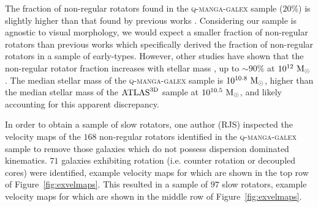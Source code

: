 \documentclass[useAMS,usenatbib]{mn2e}
\begin{document}
The fraction of non-regular rotators found in the \textsc{q-manga-galex} sample ($20\%$) is slightly higher than that found by previous works \citep[$14-17\%$ of early-types in the $\rm{ATLAS}^{\rm{3D}}$ sample; ][]{emsellem11, stott16}. Considering our sample is agnostic to visual morphology, we would expect a smaller fraction of non-regular rotators than previous works which specifically derived the fraction of non-regular rotators in a sample of early-types. However, other studies have shown that the non-regular rotator fraction increases with stellar mass \citep{cappellari13}, up to $\sim90\%$ at $10^{12}~\rm{M}_{\odot}$ \citep{veale17}. The median stellar mass of the \textsc{q-manga-galex} sample is $10^{10.8}~\rm{M}_{\odot}$, higher than the median stellar mass of the $\rm{ATLAS}^{\rm{3D}}$ sample at $10^{10.5}~\rm{M}_{\odot}$, and likely accounting for this apparent discrepancy.

In order to obtain a sample of slow rotators, one author (RJS) inspected the velocity maps of the $168$ non-regular rotators identified in the \textsc{q-manga-galex} sample to remove those galaxies which do not possess dispersion dominated kinematics. $71$ galaxies exhibiting rotation (i.e. counter rotation or decoupled cores) were identified, example velocity maps for which are shown in the top row of Figure~\ref{fig:exvelmaps}. This resulted in a sample of $97$ slow rotators, example velocity maps for which are shown in the middle row of Figure~\ref{fig:exvelmaps}.  
\end{document}
